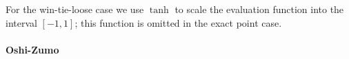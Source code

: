 For the win-tie-loose case we use $\tanh$ to scale the evaluation function into the interval $[-1,1]$; this function is omitted in the exact point case.

\paragraph{\textbf{Oshi-Zumo}}

